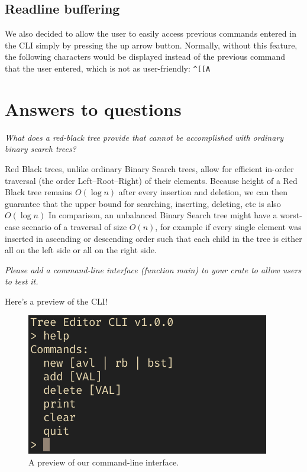 \documentclass[letterpaper]{article}
\begin{document}

\subsection{Readline buffering}
We also decided to allow the user to easily access previous commands entered in
the CLI simply by pressing the up arrow button. Normally, without this feature,
the following characters would be displayed instead of the previous command that
the user entered, which is not as user-friendly:
\verb|^[[A|


\section{Answers to questions}

\textit{What does a red-black tree provide that cannot be accomplished with
ordinary binary search trees?}

Red Black trees, unlike ordinary Binary Search trees, allow for efficient
in-order traversal (the order Left–Root–Right) of their elements.
Because  height of a Red Black tree remains \(O(\log n)\) after every
insertion and deletion, we can then guarantee that the
upper bound for searching, inserting, deleting, etc is also \(O(\log n)\)
In comparison, an unbalanced Binary Search tree might have a worst-case scenario
of a traversal of size \(O(n)\), for example if every single element was
inserted in ascending or descending order such that each child in the tree is
either all on the left side or all on the right side.

\textit{Please add a command-line interface (function main) to your crate to
allow users to test it.}

Here's a preview of the CLI!
\begin{figure}[H]
      \centering
      \includegraphics[width=.8\textwidth]{cli.png}
      \caption{A preview of our command-line interface.}
\end{figure}
\end{document}
